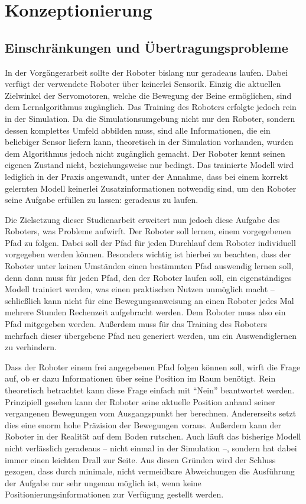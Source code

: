 \chapter{Konzeptionierung}
\section{Einschränkungen und Übertragungsprobleme}
\label{sec:probleme}
In der Vorgängerarbeit sollte der Roboter bislang nur geradeaus laufen.
Dabei verfügt der verwendete Roboter über keinerlei Sensorik.
Einzig die aktuellen Zielwinkel der Servomotoren, welche die Bewegung der Beine ermöglichen, sind dem Lernalgorithmus zugänglich.
Das Training des Roboters erfolgte jedoch rein in der Simulation.
Da die Simulationsumgebung nicht nur den Roboter, sondern dessen komplettes Umfeld abbilden muss, sind alle Informationen, die ein beliebiger Sensor liefern kann, theoretisch in der Simulation vorhanden, wurden dem Algorithmus jedoch nicht zugänglich gemacht.
Der Roboter kennt seinen eigenen Zustand nicht, beziehungsweise nur bedingt.
Das trainierte Modell wird lediglich in der Praxis angewandt, unter der Annahme, dass bei einem korrekt gelernten Modell keinerlei Zusatzinformationen notwendig sind, um den Roboter seine Aufgabe erfüllen zu lassen: geradeaus zu laufen.

Die Zielsetzung dieser Studienarbeit erweitert nun jedoch diese Aufgabe des Roboters, was Probleme aufwirft.
Der Roboter soll lernen, einem vorgegebenen Pfad zu folgen.
Dabei soll der Pfad für jeden Durchlauf dem Roboter individuell vorgegeben werden können.
Besonders wichtig ist hierbei zu beachten, dass der Roboter unter keinen Umständen einen bestimmten Pfad auswendig lernen soll, denn dann muss für jeden Pfad, den der Roboter laufen soll, ein eigenständiges Modell trainiert werden, was einen praktischen Nutzen unmöglich macht -- schließlich kann nicht für eine Bewegungsanweisung an einen Roboter jedes Mal mehrere Stunden Rechenzeit aufgebracht werden.
Dem Roboter muss also ein Pfad mitgegeben werden.
Außerdem muss für das Training des Roboters mehrfach dieser übergebene Pfad neu generiert werden, um ein Auswendiglernen zu verhindern.

Dass der Roboter einem frei angegebenen Pfad folgen können soll, wirft die Frage auf, ob er dazu Informationen über seine Position im Raum benötigt.
Rein theoretisch betrachtet kann diese Frage einfach mit \enquote{Nein} beantwortet werden.
Prinzipiell gesehen kann der Roboter seine aktuelle Position anhand seiner vergangenen Bewegungen vom Ausgangspunkt her berechnen.
Andererseits setzt dies eine enorm hohe Präzision der Bewegungen voraus.
Außerdem kann der Roboter in der Realität auf dem Boden rutschen.
Auch läuft das bisherige Modell nicht verlässlich geradeaus -- nicht einmal in der Simulation --, sondern hat dabei immer einen leichten Drall zur Seite.
Aus diesen Gründen wird der Schluss gezogen, dass durch minimale, nicht vermeidbare Abweichungen die Ausführung der Aufgabe nur sehr ungenau möglich ist, wenn keine Positionierungsinformationen zur Verfügung gestellt werden.

